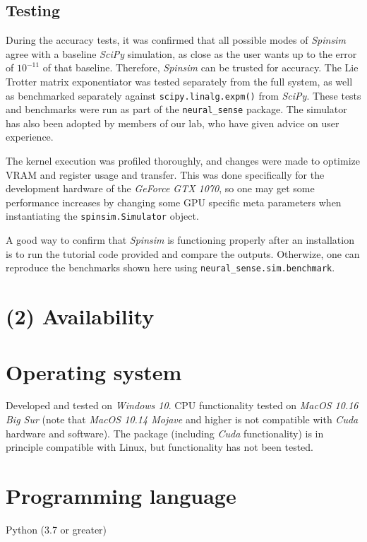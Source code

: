\documentclass{jors}
\begin{document}
	\subsection{Testing}
		During the accuracy tests, it was confirmed that all possible modes of \emph{Spinsim} agree with a baseline \emph{SciPy} simulation, as close as the user wants up to the error of $ 10^{-11} $ of that baseline.
		Therefore, \emph{Spinsim} can be trusted for accuracy.
		The Lie Trotter matrix exponentiator was tested separately from the full system, as well as benchmarked separately against \texttt{scipy.linalg.expm()} from \emph{SciPy}.
		These tests and benchmarks were run as part of the \texttt{neural\_sense} package.
		The simulator has also been adopted by members of our lab, who have given advice on user experience.

		The kernel execution was profiled thoroughly, and changes were made to optimize VRAM and register usage and transfer.
		This was done specifically for the development hardware of the \emph{GeForce GTX 1070}, so one may get some performance increases by changing some GPU specific meta parameters when instantiating the \texttt{spinsim.Simulator} object.

		A good way to confirm that \emph{Spinsim} is functioning properly after an installation is to run the tutorial code provided and compare the outputs.
		Otherwize, one can reproduce the benchmarks shown here using \texttt{neural\_sense.sim.benchmark}.

\section{(2) Availability}
\vspace{0.5cm}
\section{Operating system}
Developed and tested on \emph{Windows 10}.
CPU functionality tested on \emph{MacOS 10.16 Big Sur} (note that \emph{MacOS 10.14 Mojave} and higher is not compatible with \emph{Cuda} hardware and software).
The package (including \emph{Cuda} functionality) is in principle compatible with Linux, but functionality has not been tested.

\section{Programming language}
Python (3.7 or greater)
\end{document}
